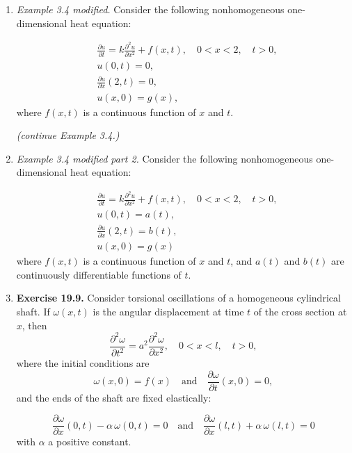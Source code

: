 \begin{enumerate}

\item \textit{Example 3.4 modified.} Consider the following nonhomogeneous one-dimensional heat equation:

\[
\begin{aligned}
    & \frac{\partial u}{\partial t}  = k \frac{\partial^{2} u}{\partial x^{2}} + f(x,t) , \quad 0 < x < 2, \quad t>0, \\
    & u(0, t) = 0, \\
    & \frac{\partial u}{\partial x}(2, t) = 0, \\
    & u (x, 0) = g(x),
\end{aligned}
\]
where $f(x, t)$ is a continuous function of $x$ and $t$.

\newpage

\textit{(continue Example 3.4.)}

\newpage

\item \textit{Example 3.4 modified part 2.} Consider the following nonhomogeneous one-dimensional heat equation:

\[
\begin{aligned}
    & \frac{\partial u}{\partial t}  = k \frac{\partial^{2} u}{\partial x^{2}} + f(x,t) , \quad 0 < x < 2, \quad t>0, \\
    & u(0, t) = a(t), \\
    & \frac{\partial u}{\partial x}(2, t) = b(t), \\
    & u (x, 0) = g(x)
\end{aligned}
\]
where $f(x, t)$ is a continuous function of $x$ and $t$, and $a(t)$ and $b(t)$ are
continuously differentiable functions of $t$.


\newpage

\item \textbf{Exercise 19.9.} Consider torsional oscillations of a homogeneous cylindrical shaft. If $\omega(x, t)$ is the angular displacement at time $t$ of the cross section at $x$, then
\[\frac{\partial^{2} \omega}{\partial t^{2}} = a^{2} \frac{\partial^{2} \omega}{\partial x^{2}}, \quad 0<x<l,\quad t>0, \]
where the initial conditions are
\[\omega(x,0)=f(x) \quad \text{and} \quad \frac{\partial \omega}{\partial t} (x,0)=0,\]
and the ends of the shaft are fixed elastically:

\[\frac{\partial \omega}{\partial x} (0,t) -\alpha\, \omega(0,t)=0 \quad \text{and} \quad \frac{\partial \omega}{\partial x} (l,t) + \alpha\, \omega(l,t)=0 \]
with $\alpha$ a positive constant.


\end{enumerate}
